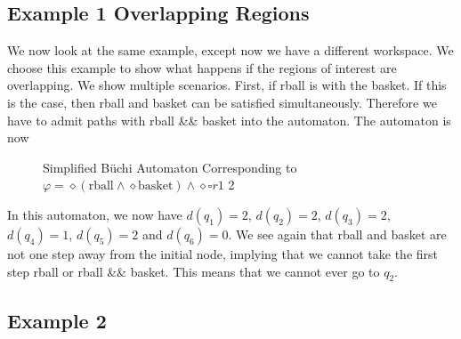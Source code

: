 \subsection{Example 1 Overlapping Regions}
We now look at the same example, except now we have a different workspace. We choose this example to show what happens if the regions of interest are overlapping. We show multiple scenarios. First, if rball is with the basket. If this is the case, then rball and basket can be satisfied simultaneously. Therefore we have to admit paths with rball \&\& basket into the automaton. The automaton is now
\begin{figure}
\centering
{}
\caption{Simplified B\"uchi Automaton Corresponding to $\varphi = \diamond (\text{rball} \wedge \diamond \text{basket}) \wedge \diamond \square r1$ 2}
\label{fig:ex1OverlapSimplifiedBuchi}
\end{figure} 

In this automaton, we now have $d(q_1)=2$, $d(q_2)=2$, $d(q_3)=2$, $d(q_4)=1$, $d(q_5) = 2$ and $d(q_6)=0$. We see again that rball and basket are not one step away from the initial node, implying that we cannot take the first step rball or rball \&\& basket. This means that we cannot ever go to $q_2$.

\subsection{Example 2}
